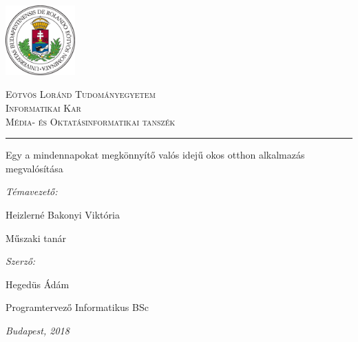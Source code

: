 
\begin{titlepage}

\noindent
\parbox[m]{0.2\textwidth}{
 \includegraphics[width=0.2\textwidth]{elte_cimer_szines.eps} %
}
\hfill
\parbox[m]{0.7\textwidth}{
\begin{center}
\begin{large}
\textsc{
Eötvös Loránd Tudományegyetem\\
\vspace{0.5pc}
Informatikai Kar\\
\vspace{0.5pc}
Média- és Oktatásinformatikai tanszék\\
}
\end{large}
\end{center}
}

\vspace{1pc}
\hrule

\vfill

\begin{center}
{\LARGE Egy a mindennapokat megkönnyítő valós idejű okos otthon alkalmazás megvalósítása}
\end{center}

\vfill

\noindent
\hspace*{0.05\textwidth}
\parbox{0.45\textwidth}{
{\it Témavezető:}
\bigskip

{\Large Heizlerné Bakonyi Viktória }
\smallskip

Műszaki tanár
}
\hfill
\parbox{0.45\textwidth}{
{\it Szerző:}
\bigskip

{\Large Hegedüs Ádám}
\smallskip

Programtervező Informatikus BSc
}


\vfill

\begin{center}
{\large {\it Budapest, 2018}}
\end{center}

\end{titlepage}
